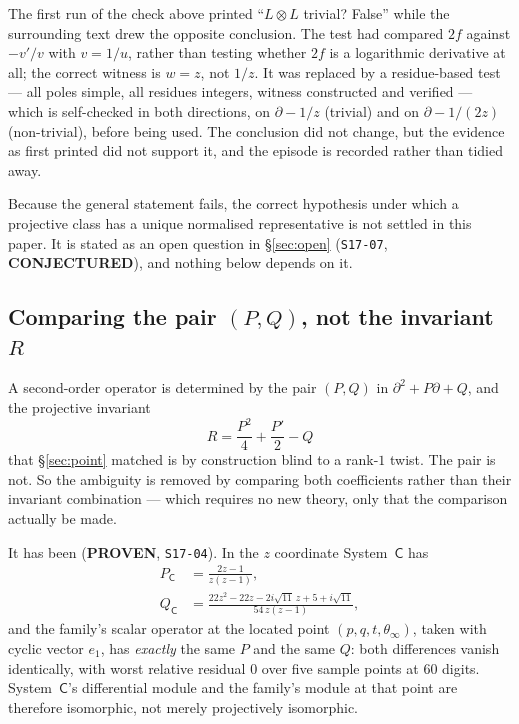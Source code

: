 \begin{remark}\label{rem:contradiction}
The first run of the check above printed ``$L\otimes L$ trivial? False'' while
the surrounding text drew the opposite conclusion. The test had compared $2f$
against $-v'/v$ with $v=1/u$, rather than testing whether $2f$ is a logarithmic
derivative at all; the correct witness is $w=z$, not $1/z$. It was replaced by
a residue-based test --- all poles simple, all residues integers, witness
constructed and verified --- which is self-checked in both directions, on
$\partial-1/z$ (trivial) and on $\partial-1/(2z)$ (non-trivial), before being
used. The conclusion did not change, but the evidence as first printed did not
support it, and the episode is recorded rather than tidied away.
\end{remark}

Because the general statement fails, the correct hypothesis under which a
projective class has a unique normalised representative is not settled in this
paper. It is stated as an open question in \S\ref{sec:open}
(\texttt{S17-07}, \textbf{CONJECTURED}), and nothing below depends on it.

\subsection{Comparing the pair \texorpdfstring{$(P,Q)$}{(P,Q)}, not the
invariant \texorpdfstring{$R$}{R}}\label{ssec:pq}

A second-order operator is determined by the pair $(P,Q)$ in
$\partial^2+P\partial+Q$, and the projective invariant
\[
  R=\frac{P^2}{4}+\frac{P'}{2}-Q
\]
that \S\ref{sec:point} matched is by construction blind to a rank-$1$ twist.
The pair is not. So the ambiguity is removed by comparing both coefficients
rather than their invariant combination --- which requires no new theory, only
that the comparison actually be made.

It has been (\textbf{PROVEN}, \texttt{S17-04}). In the $z$ coordinate
System~$\mathsf C$ has
\begin{align}
  P_{\mathsf C}&=\frac{2z-1}{z(z-1)},\label{eq:PC}\\[2pt]
  Q_{\mathsf C}&=\frac{22z^2-22z-2i\sqrt{11}\,z+5+i\sqrt{11}}
                     {54\,z(z-1)},\label{eq:QC}
\end{align}
and the family's scalar operator at the located point $(p,q,t,\theta_\infty)$,
taken with cyclic vector $e_1$, has \emph{exactly} the same $P$ and the same
$Q$: both differences vanish identically, with worst relative residual $0$ over
five sample points at $60$ digits. System~$\mathsf C$'s differential module and
the family's module at that point are therefore isomorphic, not merely
projectively isomorphic.

